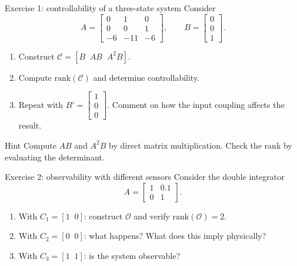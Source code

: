 \documentclass[aspectratio=169,10pt]{beamer}
\newcommand{\Ccal}{\mathcal{C}}
\newcommand{\Ocal}{\mathcal{O}}
\begin{document}
\begin{frame}{Exercise 1: controllability of a three-state system}
Consider
\[
A = \begin{bmatrix}0&1&0\\0&0&1\\-6&-11&-6\end{bmatrix},
\qquad
B = \begin{bmatrix}0\\0\\1\end{bmatrix}.
\]

\begin{enumerate}
  \item Construct $\Ccal = [B\;\;AB\;\;A^2B]$.
  \item Compute $\mathrm{rank}(\Ccal)$ and determine controllability.
  \item Repeat with $B'=\begin{bmatrix}1\\0\\0\end{bmatrix}$.
        Comment on how the input coupling affects the result.
\end{enumerate}

\begin{notebox}{Hint}
Compute $AB$ and $A^2B$ by direct matrix multiplication.
Check the rank by evaluating the determinant.
\end{notebox}
\end{frame}

\begin{frame}{Exercise 2: observability with different sensors}
Consider the double integrator
\[
A = \begin{bmatrix}1&0.1\\0&1\end{bmatrix}.
\]

\begin{enumerate}
  \item With $C_1=[1\;\;0]$: construct $\Ocal$ and verify
        $\mathrm{rank}(\Ocal)=2$.
  \item With $C_2=[0\;\;0]$: what happens?  What does this imply
        physically?
  \item With $C_3=[1\;\;1]$: is the system observable?
\end{enumerate}
\end{frame}
\end{document}
